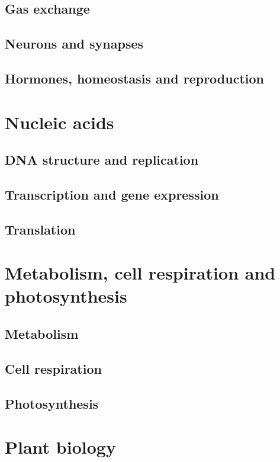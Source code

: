 \documentclass[12pt, a4paper]{article}
\begin{document}
\subsection{Gas exchange}

\subsection{Neurons and synapses}

\subsection{Hormones, homeostasis and reproduction}


\newpage
\section{Nucleic acids}
\subsection{DNA structure and replication}

\subsection{Transcription and gene expression}

\subsection{Translation}


\newpage
\section{Metabolism, cell respiration and photosynthesis}
\subsection{Metabolism}

\subsection{Cell respiration}

\subsection{Photosynthesis}


\newpage
\section{Plant biology}
\end{document}
